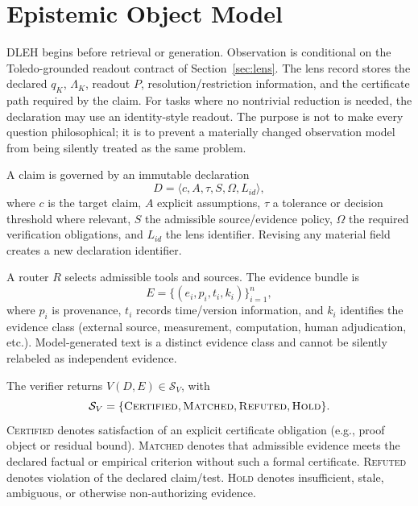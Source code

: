 \documentclass[10pt,twocolumn]{article}
\begin{document}
\section{Epistemic Object Model}
DLEH begins before retrieval or generation. Observation is conditional on the Toledo-grounded readout contract of Section~\ref{sec:lens}. The lens record stores the declared $q_K$, $\Lambda_K$, readout $P$, resolution/restriction information, and the certificate path required by the claim. For tasks where no nontrivial reduction is needed, the declaration may use an identity-style readout. The purpose is not to make every question philosophical; it is to prevent a materially changed observation model from being silently treated as the same problem.

A claim is governed by an immutable declaration
\begin{equation}
D = \langle c, A, \tau, S, \Omega, L_{id} \rangle,
\end{equation}
where $c$ is the target claim, $A$ explicit assumptions, $\tau$ a tolerance or decision threshold where relevant, $S$ the admissible source/evidence policy, $\Omega$ the required verification obligations, and $L_{id}$ the lens identifier. Revising any material field creates a new declaration identifier.

A router $R$ selects admissible tools and sources. The evidence bundle is
\begin{equation}
E = \{(e_i, p_i, t_i, k_i)\}_{i=1}^n,
\end{equation}
where $p_i$ is provenance, $t_i$ records time/version information, and $k_i$ identifies the evidence class (external source, measurement, computation, human adjudication, etc.). Model-generated text is a distinct evidence class and cannot be silently relabeled as independent evidence.

The verifier returns $V(D,E) \in \mathcal S_V$, with
\begin{equation}
\mathcal S_V = \{\textsc{Certified}, \textsc{Matched}, \textsc{Refuted}, \textsc{Hold}\}.
\end{equation}
\textsc{Certified} denotes satisfaction of an explicit certificate obligation (e.g., proof object or residual bound). \textsc{Matched} denotes that admissible evidence meets the declared factual or empirical criterion without such a formal certificate. \textsc{Refuted} denotes violation of the declared claim/test. \textsc{Hold} denotes insufficient, stale, ambiguous, or otherwise non-authorizing evidence.
\end{document}
